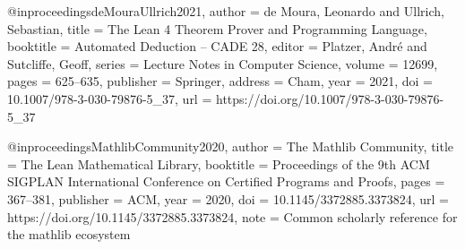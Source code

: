 \documentclass{birkjour}
\theoremstyle{plain}
\theoremstyle{definition}
\theoremstyle{remark}
\begin{document}
@inproceedings{deMouraUllrich2021,
  author    = {de Moura, Leonardo and Ullrich, Sebastian},
  title     = {The {Lean} 4 Theorem Prover and Programming Language},
  booktitle = {Automated Deduction -- {CADE} 28},
  editor    = {Platzer, Andr{\'e} and Sutcliffe, Geoff},
  series    = {Lecture Notes in Computer Science},
  volume    = {12699},
  pages     = {625--635},
  publisher = {Springer},
  address   = {Cham},
  year      = {2021},
  doi       = {10.1007/978-3-030-79876-5_37},
  url       = {https://doi.org/10.1007/978-3-030-79876-5_37}
}

@inproceedings{MathlibCommunity2020,
  author    = {{The Mathlib Community}},
  title     = {The {Lean} Mathematical Library},
  booktitle = {Proceedings of the 9th {ACM} {SIGPLAN} International Conference
               on Certified Programs and Proofs},
  pages     = {367--381},
  publisher = {ACM},
  year      = {2020},
  doi       = {10.1145/3372885.3373824},
  url       = {https://doi.org/10.1145/3372885.3373824},
  note      = {Common scholarly reference for the mathlib ecosystem}
}
\endgroup
\end{document}
